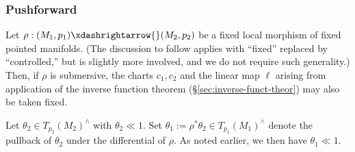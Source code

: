 \subsubsection{Pushforward}
Let $\rho : (M_1, p_1) \xdashrightarrow{} (M_2, p_2)$ be a fixed local morphism of fixed pointed manifolds.  (The discussion to follow applies with ``fixed'' replaced by ``controlled,'' but is slightly more involved, and we do not require such generality.)  Then, if $\rho$ is submersive, the charts $c_1, c_2$ and the linear map $\ell$ arising from application of the inverse function theorem (\S\ref{sec:inverse-funct-theor}) may also be taken fixed.

Let $\theta_2 \in T_{p_2}(M_2)^\wedge$ with $\theta_2 \ll 1$.  Set $\theta_1 := \rho^* \theta_2 \in T_{p_1}(M_1)^\wedge$ denote the pullback of $\theta_2$ under the differential of $\rho$.  As noted earlier, we then have $\theta_1 \ll 1$.

